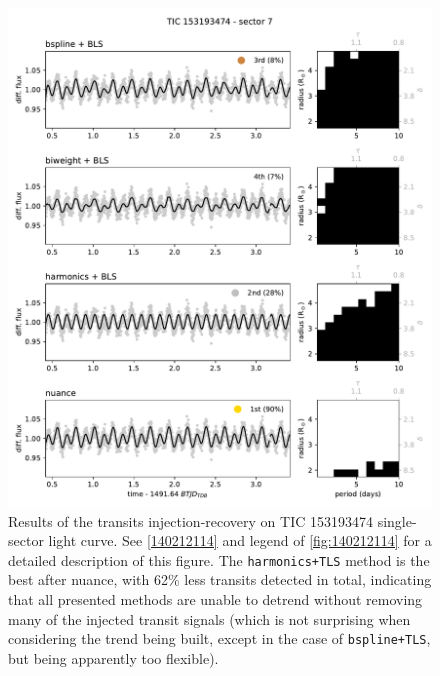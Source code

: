 \documentclass{aastex631}
\begin{document}
\begin{figure}[H]
    \begin{centering}
        \includegraphics[width=\linewidth]{153193474.pdf}
        \caption{Results of the transits injection-recovery on TIC 153193474 single-sector light curve. See \autoref{140212114} and legend of \autoref{fig:140212114} for a detailed description of this figure. The \texttt{harmonics+TLS} method is the best after \textsf{nuance}, with 62\% less transits detected in total, indicating that all presented methods are unable to detrend without removing many of the injected transit signals (which is not surprising when considering the trend being built, except in the case of \texttt{bspline+TLS}, but being apparently too flexible).}
        \label{fig:153193474}
    \end{centering}
\end{figure}
\end{document}
